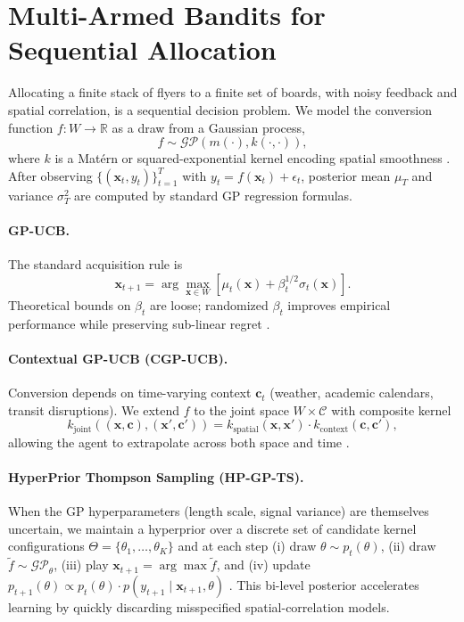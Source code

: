 \documentclass[sigconf,nonacm]{acmart}
\begin{document}
\section{Multi-Armed Bandits for Sequential Allocation}
\label{sec:bandits}

Allocating a finite stack of flyers to a finite set of boards, with noisy feedback and spatial correlation, is a sequential decision problem. We model the conversion function $f : W \to \mathbb{R}$ as a draw from a Gaussian process,
\begin{equation}
    f \sim \mathcal{GP}(m(\cdot), k(\cdot, \cdot)),
\end{equation}
where $k$ is a Mat\'ern or squared-exponential kernel encoding spatial smoothness \cite{gp-bandits, gp-ucb}. After observing $\{(\mathbf{x}_t, y_t)\}_{t=1}^T$ with $y_t = f(\mathbf{x}_t) + \epsilon_t$, posterior mean $\mu_T$ and variance $\sigma_T^2$ are computed by standard GP regression formulas.

\paragraph{GP-UCB.} The standard acquisition rule is
\begin{equation}
    \mathbf{x}_{t+1} = \arg\max_{\mathbf{x} \in W} \left[ \mu_t(\mathbf{x}) + \beta_t^{1/2} \sigma_t(\mathbf{x}) \right].
\end{equation}
Theoretical bounds on $\beta_t$ are loose; randomized $\beta_t$ improves empirical performance while preserving sub-linear regret \cite{rgpucb}.

\paragraph{Contextual GP-UCB (CGP-UCB).} Conversion depends on time-varying context $\mathbf{c}_t$ (weather, academic calendars, transit disruptions). We extend $f$ to the joint space $W \times \mathcal{C}$ with composite kernel
\begin{equation}
    k_{\text{joint}}((\mathbf{x}, \mathbf{c}), (\mathbf{x}', \mathbf{c}')) = k_{\text{spatial}}(\mathbf{x}, \mathbf{x}') \cdot k_{\text{context}}(\mathbf{c}, \mathbf{c}'),
\end{equation}
allowing the agent to extrapolate across both space and time \cite{cgpucb, cgpucb-eth}.

\paragraph{HyperPrior Thompson Sampling (HP-GP-TS).} When the GP hyperparameters (length scale, signal variance) are themselves uncertain, we maintain a hyperprior over a discrete set of candidate kernel configurations $\Theta = \{\theta_1, \dots, \theta_K\}$ and at each step (i) draw $\theta \sim p_t(\theta)$, (ii) draw $\tilde{f} \sim \mathcal{GP}_\theta$, (iii) play $\mathbf{x}_{t+1} = \arg\max \tilde{f}$, and (iv) update $p_{t+1}(\theta) \propto p_t(\theta) \cdot p(y_{t+1} \mid \mathbf{x}_{t+1}, \theta)$ \cite{hpts}. This bi-level posterior accelerates learning by quickly discarding misspecified spatial-correlation models.
\end{document}
